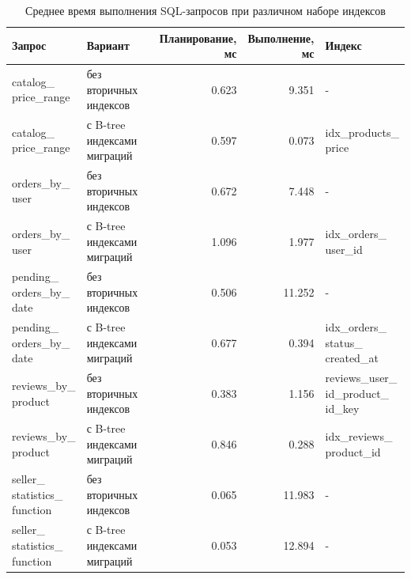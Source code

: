\begin{table}[H]
\centering
\scriptsize
\caption{Среднее время выполнения SQL-запросов при различном наборе индексов}
\label{tbl:research_presence}
\begin{tabular}{|p{}|p{}|r|r|p{}|}
\hline
Запрос & Вариант & \makecell{Планирование,\\мс} & \makecell{Выполнение,\\мс} & Индекс \\ \hline
\makecell[l]{catalog\_\\price\_range} & без вторичных индексов & 0.623 & 9.351 & - \\ \hline
\makecell[l]{catalog\_\\price\_range} & с B-tree индексами миграций & 0.597 & 0.073 & \makecell[l]{idx\_products\_\\price} \\ \hline
\makecell[l]{orders\_by\_\\user} & без вторичных индексов & 0.672 & 7.448 & - \\ \hline
\makecell[l]{orders\_by\_\\user} & с B-tree индексами миграций & 1.096 & 1.977 & \makecell[l]{idx\_orders\_\\user\_id} \\ \hline
\makecell[l]{pending\_\\orders\_by\_\\date} & без вторичных индексов & 0.506 & 11.252 & - \\ \hline
\makecell[l]{pending\_\\orders\_by\_\\date} & с B-tree индексами миграций & 0.677 & 0.394 & \makecell[l]{idx\_orders\_\\status\_\\created\_at} \\ \hline
\makecell[l]{reviews\_by\_\\product} & без вторичных индексов & 0.383 & 1.156 & \makecell[l]{reviews\_user\_\\id\_product\_\\id\_key} \\ \hline
\makecell[l]{reviews\_by\_\\product} & с B-tree индексами миграций & 0.846 & 0.288 & \makecell[l]{idx\_reviews\_\\product\_id} \\ \hline
\makecell[l]{seller\_\\statistics\_\\function} & без вторичных индексов & 0.065 & 11.983 & - \\ \hline
\makecell[l]{seller\_\\statistics\_\\function} & с B-tree индексами миграций & 0.053 & 12.894 & - \\ \hline
\end{tabular}
\end{table}

